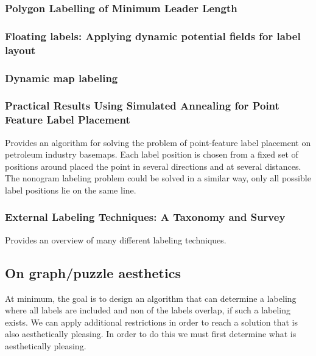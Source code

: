 \documentclass[a4paper]{article}
\begin{document}
\subsubsection{Polygon Labelling of Minimum Leader Length \cite{Bekos:2006:PLM:1151903.1151906}}

\subsubsection{Floating labels: Applying dynamic potential fields for label layout \cite{hartmann2004floating}}

\subsubsection{Dynamic map labeling \cite{been2006dynamic}}

\subsubsection{Practical Results Using Simulated Annealing for Point Feature Label Placement \cite{zoraster1997practical}}
Provides an algorithm for solving the problem of point-feature label placement on petroleum industry basemaps. Each label position is chosen from a fixed set of positions around placed the point in several directions and at several distances.  The nonogram labeling problem could be solved in a similar way, only all possible label positions lie on the same line.

\subsubsection{External Labeling Techniques: A Taxonomy and Survey \cite{bekos2019external}}
Provides an overview of many different labeling techniques.

\subsection{On graph/puzzle aesthetics}
At minimum, the goal is to design an algorithm that can determine a labeling where all labels are included and non of the labels overlap, if such a labeling exists. We can apply additional restrictions in order to reach a solution that is also aesthetically pleasing. In order to do this we must first determine what is aesthetically pleasing.\\
\end{document}
